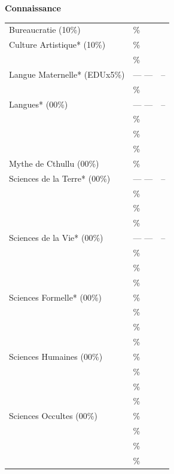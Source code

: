 \documentclass[11pt,twoside,a4paper]{article}
\begin{document}
\begin{multicols}{3}
	\textbf{Connaissance} \hrulefill ~\\  	%
	{\scriptsize \begin{tabular}[c]{ p{4.00cm} p{1.00cm}|c|}
		\cline{3-3}
		Bureaucratie (10\%)		& \dotfill \% & ~ \\
		\cline{3-3}
		Culture Artistique* (10\%)	& \dotfill \% & ~ \\
		\cline{3-3}
		\dotfill			& \dotfill \% & ~ \\
		\cline{3-3}
		Langue Maternelle* (EDUx5\%)	& --- ---     & -- \\
		\cline{3-3}
		\dotfill			& \dotfill \% & ~ \\
		\cline{3-3}
		Langues* (00\%)			& --- ---     & -- \\
		\cline{3-3}
		\dotfill			& \dotfill \% & ~ \\
		\cline{3-3}
		\dotfill			& \dotfill \% & ~ \\
		\cline{3-3}
		\dotfill			& \dotfill \% & ~ \\
		\cline{3-3}
		Mythe de Cthullu (00\%)		& \dotfill \% & ~ \\
		\cline{3-3}
		Sciences de la Terre* (00\%)	& --- ---     & -- \\
		\cline{3-3}
		\dotfill			& \dotfill \% & ~ \\
		\cline{3-3}
		\dotfill			& \dotfill \% & ~ \\
		\cline{3-3}
		\dotfill			& \dotfill \% & ~ \\
		\cline{3-3}
		Sciences de la Vie* (00\%)	& --- ---     & -- \\
		\cline{3-3}
		\dotfill			& \dotfill \% & ~ \\
		\cline{3-3}
		\dotfill			& \dotfill \% & ~ \\
		\cline{3-3}
		\dotfill			& \dotfill \% & ~ \\
		\cline{3-3}
		Sciences Formelle* (00\%)	& \dotfill \% & ~ \\
		\cline{3-3}
		\dotfill			& \dotfill \% & ~ \\
		\cline{3-3}
		\dotfill			& \dotfill \% & ~ \\
		\cline{3-3}
		\dotfill			& \dotfill \% & ~ \\
		\cline{3-3}
		Sciences Humaines (00\%)	& \dotfill \% & ~ \\
		\cline{3-3}
		\dotfill			& \dotfill \% & ~ \\
		\cline{3-3}
		\dotfill			& \dotfill \% & ~ \\
		\cline{3-3}
		\dotfill			& \dotfill \% & ~ \\
		\cline{3-3}
		Sciences Occultes (00\%)	& \dotfill \% & ~ \\
		\cline{3-3}
		\dotfill			& \dotfill \% & ~ \\
		\cline{3-3}
		\dotfill			& \dotfill \% & ~ \\
		\cline{3-3}
		\dotfill			& \dotfill \% & ~ \\
		\cline{3-3}
	\end{tabular} }~\\
	

\end{multicols}
\end{document}
